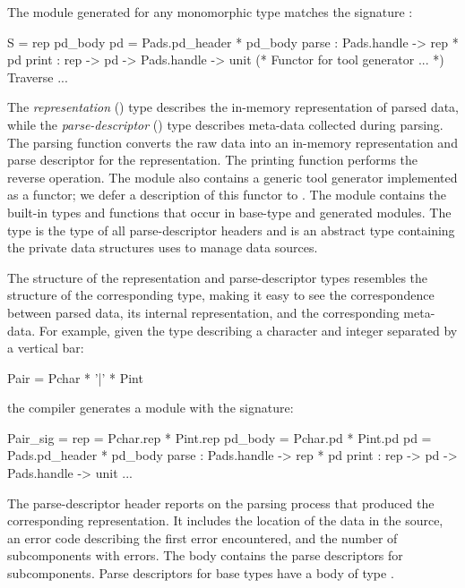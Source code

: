 \documentclass{sigplanconf}
\begin{document}
The module generated for any monomorphic \padsml{} type 
matches the signature :
\begin{code}\scriptsize
{}  S = 
   rep
   pd\_body
   pd = Pads.pd_header * pd_body
    parse : Pads.handle -> rep * pd
    print : rep -> pd -> Pads.handle -> unit
  (* Functor for tool generator ... *)
   Traverse ...
\end{code}%
\noindent 
The \emph{representation} () type describes the
in-memory representation of parsed data, while the
\emph{parse-descriptor} () type describes meta-data collected
during parsing.
The parsing function converts the raw data into an in-memory
representation and parse descriptor for the representation.
The printing function performs the reverse operation.
The module also contains a generic tool generator implemented as a functor; we defer a description of this functor to .
The module  contains the
built-in types and functions that occur in base-type and generated
modules.  The type  is the type of all parse-descriptor
headers and  is an abstract type containing the
private data structures \padsml{} uses to manage data sources.

The structure of the representation and parse-descriptor types
resembles the structure of the corresponding \padsml{} type, making it
easy to see the correspondence between parsed data, its internal
representation, and the corresponding meta-data.  
For example, given the \padsml{} type  describing a character
and integer separated by a vertical bar:
\begin{code}\scriptsize
   Pair = Pchar * '|' * Pint\end{code}%
the compiler generates a module with the signature:
\begin{code}\scriptsize
{}  Pair_sig = 
   rep     = Pchar.rep * Pint.rep
   pd_body = Pchar.pd  * Pint.pd
   pd      = Pads.pd_header * pd_body
    parse   : Pads.handle -> rep * pd
    print   : rep -> pd -> Pads.handle -> unit
  ...
\end{code}%
\noindent 
The parse-descriptor header reports on the parsing
process that produced the corresponding representation.  It includes
the location of the data in the source, an error code
describing the first error encountered, and the number of
subcomponents with errors.  The body contains the parse
descriptors for subcomponents.
Parse descriptors for base types have a body of type .
\end{document}
